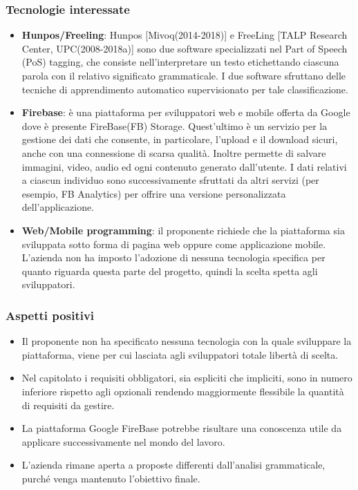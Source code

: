 \subsubsection{Tecnologie interessate}
\begin{itemize}
	\item \textbf{Hunpos/Freeling}: Hunpos [Mivoq(2014-2018)] e FreeLing [TALP
	Research Center, UPC(2008-2018a)] sono due software specializzati nel Part
	of Speech (PoS) tagging, che consiste nell'interpretare un testo
	etichettando ciascuna parola con il relativo significato grammaticale. I
	due software sfruttano delle tecniche di apprendimento automatico
	supervisionato per tale classificazione.  
	
	\item \textbf{Firebase}: è una piattaforma per sviluppatori web e mobile
	 offerta da Google dove è presente FireBase(FB) Storage. Quest'ultimo è un
	 servizio per la gestione dei dati che consente, in particolare, l'upload e
	 il download sicuri, anche con una connessione di scarsa qualità. Inoltre 
	 permette di salvare immagini, video, audio ed ogni contenuto generato
	 dall'utente. I dati relativi a ciascun individuo sono successivamente
	 sfruttati da altri servizi (per esempio, FB Analytics) per offrire una versione
	 personalizzata dell'applicazione.
	 
	\item \textbf{Web/Mobile programming}: il proponente richiede che la
	piattaforma sia sviluppata sotto forma di pagina web oppure come
	applicazione mobile. L'azienda non ha imposto l'adozione di nessuna
	tecnologia specifica per quanto riguarda questa parte del progetto, quindi
	la scelta spetta agli sviluppatori.		
\end{itemize}
\subsubsection{Aspetti positivi}
\begin{itemize}
	\item Il proponente non ha specificato nessuna tecnologia con la quale
	 sviluppare la piattaforma, viene per cui lasciata agli sviluppatori totale
	 libertà di scelta.
	\item Nel capitolato i requisiti obbligatori, sia espliciti che impliciti,
	 sono in numero inferiore rispetto agli opzionali rendendo maggiormente
	 flessibile la quantità di requisiti da gestire.
	\item La piattaforma Google FireBase potrebbe risultare una conoscenza
	 utile da applicare successivamente nel mondo del lavoro.
	\item L'azienda rimane aperta a proposte differenti dall'analisi
	 grammaticale, purché venga mantenuto l'obiettivo finale.
	
\end{itemize}
